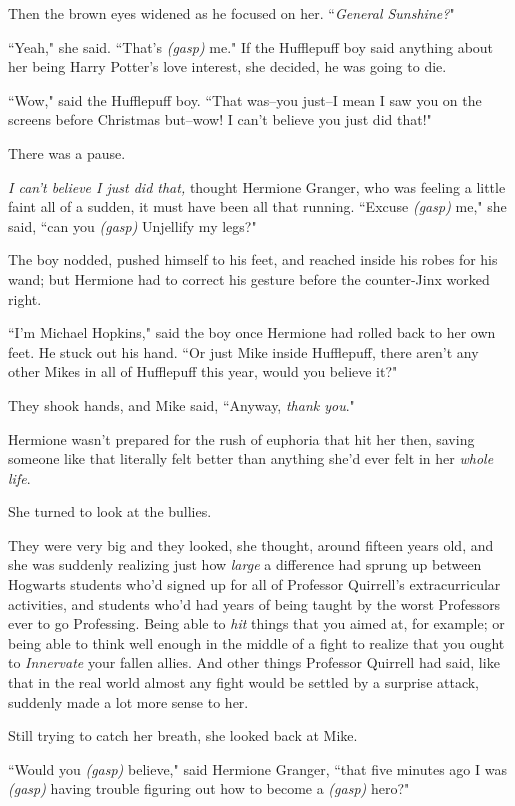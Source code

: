 Then the brown eyes widened as he focused on her. ``\emph{General Sunshine?}"

``Yeah," she said. ``That's \emph{(gasp)} me." If the Hufflepuff boy said anything about her being Harry Potter's love interest, she decided, he was going to die.

``Wow," said the Hufflepuff boy. ``That was\---you just\---I mean I saw you on the screens before Christmas but\---wow! I can't believe you just did that!"

There was a pause.

\emph{I can't believe I just did that,} thought Hermione Granger, who was feeling a little faint all of a sudden, it must have been all that running. ``Excuse \emph{(gasp)} me," she said, ``can you \emph{(gasp)} Unjellify my legs?"

The boy nodded, pushed himself to his feet, and reached inside his robes for his wand; but Hermione had to correct his gesture before the counter-Jinx worked right.

``I'm Michael Hopkins," said the boy once Hermione had rolled back to her own feet. He stuck out his hand. ``Or just Mike inside Hufflepuff, there aren't any other Mikes in all of Hufflepuff this year, would you believe it?"

They shook hands, and Mike said, ``Anyway, \emph{thank you}."

Hermione wasn't prepared for the rush of euphoria that hit her then, saving someone like that literally felt better than anything she'd ever felt in her \emph{whole life}.

She turned to look at the bullies.

They were very big and they looked, she thought, around fifteen years old, and she was suddenly realizing just how \emph{large} a difference had sprung up between Hogwarts students who'd signed up for all of Professor Quirrell's extracurricular activities, and students who'd had years of being taught by the worst Professors ever to go Professing. Being able to \emph{hit} things that you aimed at, for example; or being able to think well enough in the middle of a fight to realize that you ought to \emph{Innervate} your fallen allies. And other things Professor Quirrell had said, like that in the real world almost any fight would be settled by a surprise attack, suddenly made a lot more sense to her.

Still trying to catch her breath, she looked back at Mike.

``Would you \emph{(gasp)} believe," said Hermione Granger, ``that five minutes ago I was \emph{(gasp)} having trouble figuring out how to become a \emph{(gasp)} hero?"


